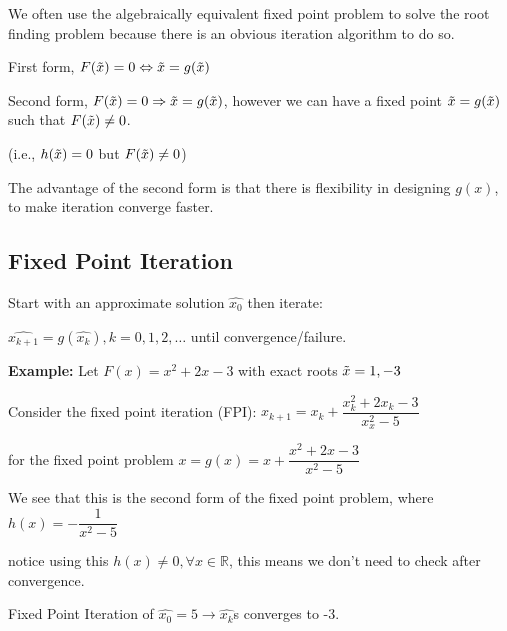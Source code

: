 \documentclass{article}
\begin{document}
\vspace{0.2cm}

We often use the algebraically equivalent fixed point problem to solve the root finding problem because there is an obvious iteration algorithm to do so.

\vspace{0.2cm}

First form, $F(\Tilde{x}) = 0 \Leftrightarrow \Tilde{x} = g(\Tilde{x})$

Second form, $F(\Tilde{x}) = 0 \Rightarrow \Tilde{x} =  g(\Tilde{x})$, however we can have a fixed point $\Tilde{x} = g(\Tilde{x})$ such that $F(\Tilde{x}) \neq 0$. 

\hspace{3cm} (i.e., $h(\Tilde{x}) = 0$ but $F(\Tilde{x}) \neq 0$) 

\vspace{0.2cm}

The advantage of the second form is that there is flexibility in designing $g(x)$, to make iteration converge faster.


\subsection{Fixed Point Iteration}

Start with an approximate solution $\hat{x_0}$ then iterate:

\hspace{0.3cm}    $\hat{x_{k + 1}} = g(\hat{x_k}), k = 0, 1, 2, \dots $ until convergence/failure.

\vspace{0.2cm}

\textbf{Example:} Let $F(x) = x^2 + 2x - 3$ with exact roots $\Tilde{x} = 1, -3$

Consider the fixed point iteration (FPI): $x_{k + 1} = x_{k} + \dfrac{x_k^2 + 2x_k - 3}{x_x^2 - 5}$ 

for the fixed point problem $x = g(x) = x + \dfrac{x^2 + 2x - 3}{x^2 - 5}$

We see that this is the second form of the fixed point problem, where $h(x) = -\dfrac{1}{x^2 - 5}$

notice using this $h(x) \neq 0, \forall x \in \mathbb R$, this means we don't need to check after convergence.

\vspace{0.2cm}

Fixed Point Iteration of $\hat{x_0} = 5 \to \hat{x_k}$s converges to -3.
\end{document}
